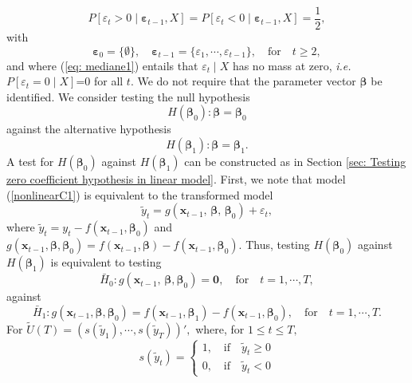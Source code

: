 \documentclass[harvard,11pt]{article}
\begin{document}
\begin{equation}\label{eq: mediane1}
P[\varepsilon_{t}> 0\mid \bm{{\varepsilon}}_{t-1},X]=P[\varepsilon_{t}<0\mid \bm{\varepsilon}_{t-1},X]=\frac{1}{2},
\end{equation}%
with
\[
\bm{\varepsilon}_{0}=\{\emptyset\},\quad\bm{\varepsilon}_{t-1}=\{\varepsilon_1,\cdots,\varepsilon_{t-1}\},\quad\text{for}\quad t\geq2,
\]
and where (\ref{eq: mediane1}) entails that $\varepsilon_t\mid X$ has no mass at zero, \emph{i.e.} $P[\varepsilon_t=0\mid X]$=0 for all $t$. We do not require that the
parameter vector $\bm{\beta} $ be identified. We consider testing the null hypothesis%
\begin{equation}
H(\bm{\beta}_{0}):\bm{\beta} =\bm{\beta} _{0}  \label{h01}
\end{equation}%
against the alternative hypothesis%
\begin{equation}
H(\bm{\beta}_{1}):\bm{\beta} =\bm{\beta}_{1}\text{.}  \label{h02}
\end{equation}%
A test for $H(\bm{\beta}_{0})$ against $H(\bm{\beta}_{1})$ can be constructed as in
Section \ref{sec: Testing zero coefficient hypothesis in linear model}.
First, we note that model (\ref{nonlinearC1}) is equivalent to the
transformed model%
\begin{equation*}
\tilde{y}_{t}=g(\bm{x}_{t-1},\,\bm{\beta} ,\,\bm{\beta} _{0})+\varepsilon_{t},
\end{equation*}%
where $\tilde{y}_{t}=y_{t}-f(\bm{x}_{t-1},\bm{\beta}_{0})$ and\ $g(\bm{x}_{t-1},\bm{\beta}
,\bm{\beta} _{0})=f(\bm{x}_{t-1},\bm{\beta} )-f(\bm{x}_{t-1},\bm{\beta}_{0})$. Thus, testing $%
H(\bm{\beta}_{0})$ against $H(\bm{\beta}_{1})$ is equivalent to testing%
\begin{equation*}
\bar{H}_{0}:g(\bm{x}_{t-1},\,\bm{\beta} ,\bm{\beta} _{0})=\bm{0},\quad\text{for}\quad t=1,\cdots,T,
\end{equation*}%
against%
\begin{equation*}
\bar{H}_{1}:g(\bm{x}_{t-1},\bm{\beta} ,\bm{\beta}_{0})=f(\bm{x}_{t-1},\bm{\beta}_{1})-f(\bm{x}_{t-1},\bm{\beta}
_{0}),\quad\text{for}\quad t=1,\cdots,T.
\end{equation*}%
For $\tilde{U}(T)=(s(\tilde{y}_{1}),\cdots,s(\tilde{y}_{T}))',$
where, for $1\leq t\leq T,$%
\begin{equation*}
s(\tilde{y}_{t})= 
\begin{cases}
1,\quad\text{if}\quad\tilde{y}_{t}\geq 0 \\ 
0,\quad\text{if}\quad\tilde{y}_{t}<0%
\end{cases}%
\end{equation*}%
\end{document}
